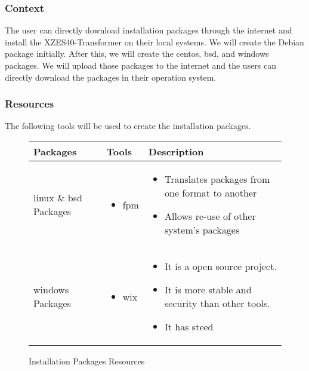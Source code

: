 \begin{enmerate}
\begin{itemzie}
\subsubsection{Context}

The user can directly download installation packages through the internet and install the XZES40-Transformer on their local systems.
We will create the Debian package initially.
After this, we will create the \gls{centos}, \gls{bsd}, and \gls{windows} packages.
We will upload those packages to the internet and the users can directly download the packages in their operation system.

\subsubsection{Resources}

The following tools will be used to create the installation packages. 
\begin{figure}
\begin{center}                                                                       
    \begin{tabular}{ | p{2.5cm} | p{5cm} | p{5cm} | }
    \hline
      Packages & Tools & Description\\ \hline
      \gls{linux} \& \gls{bsd} Packages  & 
      \begin{itemize}
      \item \gls{fpm}
      \end{itemize}
      & \begin{itemize}
      \item Translates packages from one format to another
      \item Allows re-use of other system's packages
      \end{itemize}
      \\ \hline
      \gls{windows} Packages & 
      \begin{itemize}
      \item \gls{wix}
      \end{itemize}
      & \begin{itemize}
      \item It is a open source project.
      \item It is more stable and security than other tools.
      \item It has steed
      \end{itemize}
      \\ \hline
    \end{tabular}
\end{center}
\caption{Installation Packages Resources}
\end{figure}

\end{itemzie}
\end{enmerate}
